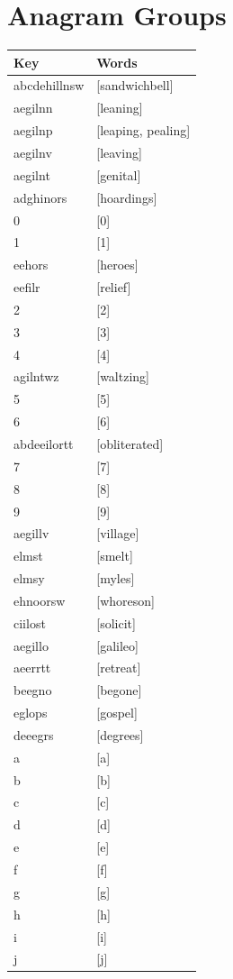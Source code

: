 \documentclass{article}
\begin{document}
\section*{Anagram Groups}
\begin{tabular}{ll}
Key & Words \\ \hline
abcdehillnsw & [sandwichbell] \\
aegilnn & [leaning] \\
aegilnp & [leaping, pealing] \\
aegilnv & [leaving] \\
aegilnt & [genital] \\
adghinors & [hoardings] \\
0 & [0] \\
1 & [1] \\
eehors & [heroes] \\
eefilr & [relief] \\
2 & [2] \\
3 & [3] \\
4 & [4] \\
agilntwz & [waltzing] \\
5 & [5] \\
6 & [6] \\
abdeeilortt & [obliterated] \\
7 & [7] \\
8 & [8] \\
9 & [9] \\
aegillv & [village] \\
elmst & [smelt] \\
elmsy & [myles] \\
ehnoorsw & [whoreson] \\
ciilost & [solicit] \\
aegillo & [galileo] \\
aeerrtt & [retreat] \\
beegno & [begone] \\
eglops & [gospel] \\
deeegrs & [degrees] \\
a & [a] \\
b & [b] \\
c & [c] \\
d & [d] \\
e & [e] \\
f & [f] \\
g & [g] \\
h & [h] \\
i & [i] \\
j & [j] \\

\end{tabular}
\end{document}

